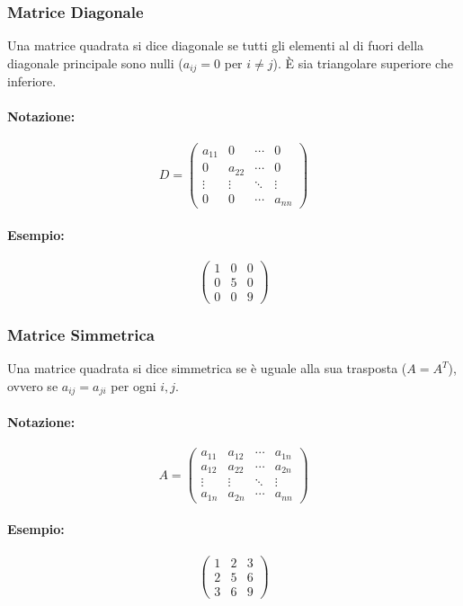 \documentclass{article}
\begin{document}
\subsubsection*{Matrice Diagonale}
Una matrice quadrata si dice diagonale se tutti gli elementi al di fuori della diagonale principale sono nulli ($a_{ij} = 0$ per $i \neq j$). È sia triangolare superiore che inferiore.
\paragraph{Notazione:}
\[ D = \begin{pmatrix}
a_{11} & 0 & \cdots & 0 \\
0 & a_{22} & \cdots & 0 \\
\vdots & \vdots & \ddots & \vdots \\
0 & 0 & \cdots & a_{nn}
\end{pmatrix} \]
\paragraph{Esempio:}
\[ \begin{pmatrix}
1 & 0 & 0 \\
0 & 5 & 0 \\
0 & 0 & 9
\end{pmatrix} \]

\subsubsection*{Matrice Simmetrica}
Una matrice quadrata si dice simmetrica se è uguale alla sua trasposta ($A = A^T$), ovvero se $a_{ij} = a_{ji}$ per ogni $i,j$.
\paragraph{Notazione:}
\[ A = \begin{pmatrix}
a_{11} & a_{12} & \cdots & a_{1n} \\
a_{12} & a_{22} & \cdots & a_{2n} \\
\vdots & \vdots & \ddots & \vdots \\
a_{1n} & a_{2n} & \cdots & a_{nn}
\end{pmatrix} \]
\paragraph{Esempio:}
\[ \begin{pmatrix}
1 & 2 & 3 \\
2 & 5 & 6 \\
3 & 6 & 9
\end{pmatrix} \]
\end{document}
